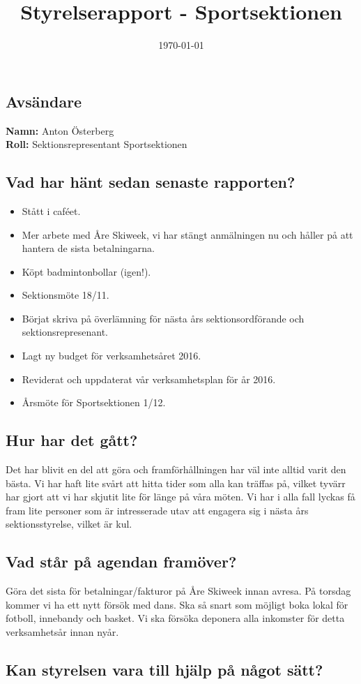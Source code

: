 \documentclass[a4paper]{article}
\begin{document}
	\title{Styrelserapport - Sportsektionen}
	\date{\today}
	\maketitle

	\subsection{Avsändare}
		\textbf{Namn:} Anton Österberg\\
		\textbf{Roll:} Sektionsrepresentant Sportsektionen\\
	\subsection{Vad har hänt sedan senaste rapporten?}
	\begin{itemize}
		\item Stått i caféet.
		\item Mer arbete med Åre Skiweek, vi har stängt anmälningen nu och håller på att hantera de sista betalningarna.
		\item Köpt badmintonbollar (igen!).
		\item Sektionsmöte 18/11.
		\item Börjat skriva på överlämning för nästa års sektionsordförande och sektionsrepresenant.
		\item Lagt ny budget för verksamhetsåret 2016.
		\item Reviderat och uppdaterat vår verksamhetsplan för år 2016.
		\item Årsmöte för Sportsektionen 1/12.
	\end{itemize}
	\subsection{Hur har det gått?}
	Det har blivit en del att göra och framförhållningen har väl inte alltid varit den bästa. Vi har haft lite svårt att hitta tider som alla kan träffas på, vilket tyvärr har gjort att vi har skjutit lite för länge på våra möten. Vi har i alla fall lyckas få fram lite personer som är intresserade utav att engagera sig i nästa års sektionsstyrelse, vilket är kul.
	\subsection{Vad står på agendan framöver?}
	Göra det sista för betalningar/fakturor på Åre Skiweek innan avresa. På torsdag kommer vi ha ett nytt försök med dans. Ska så snart som möjligt boka lokal för fotboll, innebandy och basket. Vi ska försöka deponera alla inkomster för detta verksamhetsår innan nyår.
	\subsection{Kan styrelsen vara till hjälp på något sätt?}
\end{document}
